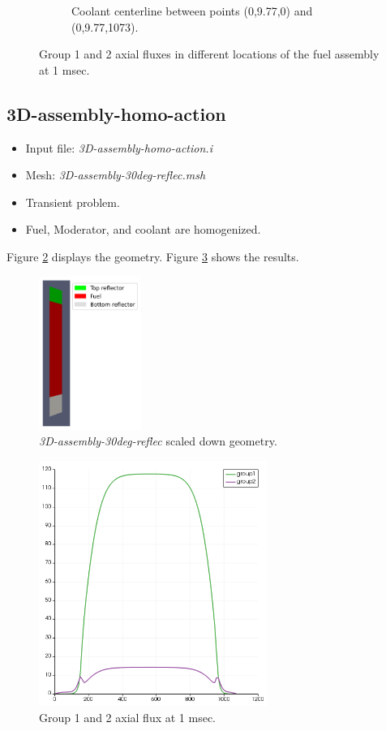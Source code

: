 \documentclass[11pt,letterpaper]{article}
\begin{document}
\begin{figure}[htbp!]
\begin{subfigure}[t]{0.4\textwidth}
			\caption{Coolant centerline between points (0,9.77,0) and (0,9.77,1073).}
		\end{subfigure}
		\hfill
		\caption{Group 1 and 2 axial fluxes in different locations of the fuel assembly at 1 msec.}
		\label{fig:3D-assembly1}
	\end{figure}

\subsection{3D-assembly-homo-action}

	\begin{itemize}
		\item Input file: \textit{3D-assembly-homo-action.i}
		\item Mesh: \textit{3D-assembly-30deg-reflec.msh}
		\item Transient problem.
		\item Fuel, Moderator, and coolant are homogenized.
	\end{itemize}

Figure \ref{fig:3D-assembly-homo} displays the geometry.
Figure \ref{fig:3D-assembly-homo1} shows the results.

	\begin{figure}[htbp!]
		\centering
		\includegraphics[height=5cm]{3D-assembly-homo-mesh}
		\caption{\textit{3D-assembly-30deg-reflec} scaled down geometry.}
		\label{fig:3D-assembly-homo}
	\end{figure}

	\begin{figure}[htbp!]
		\centering
		\includegraphics[height=8cm]{3D-assembly-homo}
		\caption{Group 1 and 2 axial flux at 1 msec.}
		\label{fig:3D-assembly-homo1}
	\end{figure}
\end{document}

